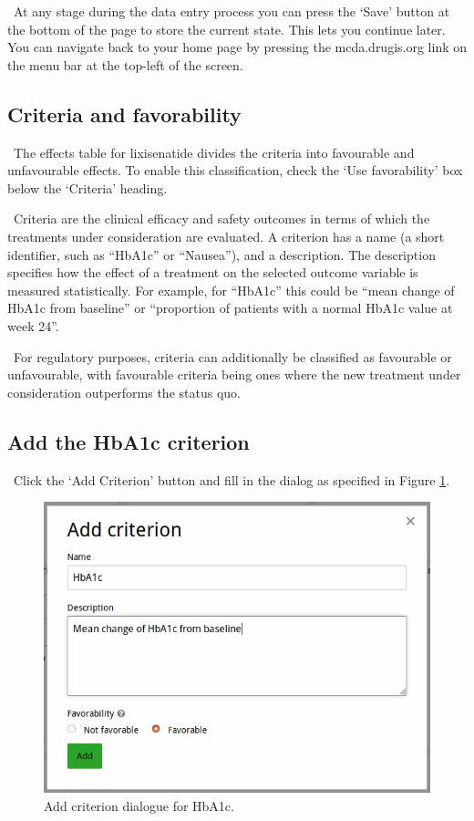 \documentclass[00_mcda_tutorial.tex]{subfiles}
\begin{document}
\noindent \faLightbulbO \, At any stage during the data entry process you can press the ‘Save’ button at the bottom of the page to store the current state. This lets you continue later. You can navigate back to your home page by pressing the mcda.drugis.org link on the menu bar at the top-left of the screen.

\subsection*{Criteria and favorability}
\noindent \leftpointright \, The effects table for lixisenatide divides the criteria into favourable and unfavourable effects. To enable this classification, check the ‘Use favorability’ box below the ‘Criteria’ heading.
\newline

\noindent \faGraduationCap \, Criteria are the clinical efficacy and safety outcomes in terms of which the treatments under consideration are evaluated. A criterion has a name (a short identifier, such as  “HbA1c” or “Nausea”), and a description. The description specifies how the effect of a treatment on the selected outcome variable is measured statistically. For example, for “HbA1c” this could be “mean change of HbA1c from baseline” or “proportion of patients with a normal HbA1c value at week 24”.
\newline

\noindent \faGraduationCap \, For regulatory purposes, criteria can additionally be classified as favourable or unfavourable, with favourable criteria being ones where the new treatment under consideration outperforms the status quo.

\subsection*{Add the HbA1c criterion}
\noindent \leftpointright \, Click the ‘Add Criterion’ button and fill in the dialog as specified in Figure \ref{fig:crit1}.

\begin{figure}[!h]
    \centering
	\includegraphics[width=\textwidth]{fig/addhba1c.png}
    \caption{Add criterion dialogue for HbA1c.}
	\label{fig:crit1}
\end{figure}
\end{document}
